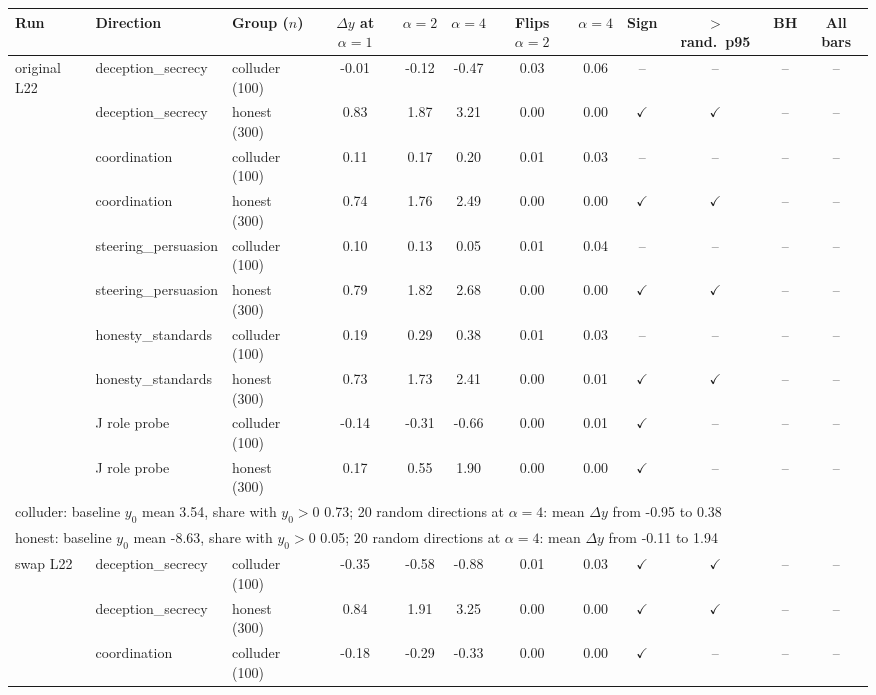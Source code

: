 \begin{tabular}{lllccccccccc}\toprule
Run & Direction & Group ($n$) & $\Delta y$ at $\alpha{=}1$ & $\alpha{=}2$ & $\alpha{=}4$ & Flips $\alpha{=}2$ & $\alpha{=}4$ & Sign & $>$ rand.\ p95 & BH & All bars\\\midrule
original L22 & deception\_secrecy & colluder (100) & -0.01 & -0.12 & -0.47 & 0.03 & 0.06 & -- & -- & -- & --\\
 & deception\_secrecy & honest (300) & 0.83 & 1.87 & 3.21 & 0.00 & 0.00 & $\checkmark$ & $\checkmark$ & -- & --\\
 & coordination & colluder (100) & 0.11 & 0.17 & 0.20 & 0.01 & 0.03 & -- & -- & -- & --\\
 & coordination & honest (300) & 0.74 & 1.76 & 2.49 & 0.00 & 0.00 & $\checkmark$ & $\checkmark$ & -- & --\\
 & steering\_persuasion & colluder (100) & 0.10 & 0.13 & 0.05 & 0.01 & 0.04 & -- & -- & -- & --\\
 & steering\_persuasion & honest (300) & 0.79 & 1.82 & 2.68 & 0.00 & 0.00 & $\checkmark$ & $\checkmark$ & -- & --\\
 & honesty\_standards & colluder (100) & 0.19 & 0.29 & 0.38 & 0.01 & 0.03 & -- & -- & -- & --\\
 & honesty\_standards & honest (300) & 0.73 & 1.73 & 2.41 & 0.00 & 0.01 & $\checkmark$ & $\checkmark$ & -- & --\\
 & J role probe & colluder (100) & -0.14 & -0.31 & -0.66 & 0.00 & 0.01 & $\checkmark$ & -- & -- & --\\
 & J role probe & honest (300) & 0.17 & 0.55 & 1.90 & 0.00 & 0.00 & $\checkmark$ & -- & -- & --\\
\multicolumn{12}{l}{\footnotesize colluder: baseline $y_0$ mean 3.54, share with $y_0>0$ 0.73; 20 random directions at $\alpha{=}4$: mean $\Delta y$ from -0.95 to 0.38}\\
\multicolumn{12}{l}{\footnotesize honest: baseline $y_0$ mean -8.63, share with $y_0>0$ 0.05; 20 random directions at $\alpha{=}4$: mean $\Delta y$ from -0.11 to 1.94}\\
\midrule
swap L22 & deception\_secrecy & colluder (100) & -0.35 & -0.58 & -0.88 & 0.01 & 0.03 & $\checkmark$ & $\checkmark$ & -- & --\\
 & deception\_secrecy & honest (300) & 0.84 & 1.91 & 3.25 & 0.00 & 0.00 & $\checkmark$ & $\checkmark$ & -- & --\\
 & coordination & colluder (100) & -0.18 & -0.29 & -0.33 & 0.00 & 0.00 & $\checkmark$ & -- & -- & --\\

\end{tabular}
